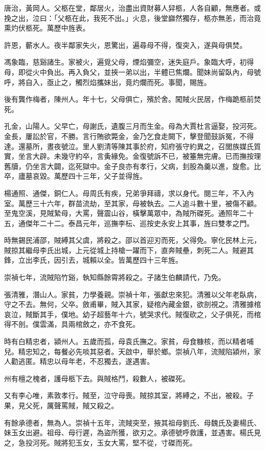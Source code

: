 \begin{pinyinscope}
唐治，黃岡人。父柩在堂，鄰居火，治盡出資財募人舁柩，人各自顧，無應者。或挽之出，泣曰：「父柩在此，我死不出。」火息，後堂巋然獨存，柩亦無恙，而治竟熏灼伏柩死。萬歷中旌表。

許恩，蘄水人。夜半鄰家失火，恩驚出，遍尋母不得，復突入，遂與母俱焚。

馮象臨，慈谿諸生。家被火，遍覓父母，煙焰彌空，迷失庭戶。象臨大呼，初得母，即從火中負出。再入負父，並挾一弟以出，半體已焦爛。聞妹尚留臥內，母號呼，將自入，亟止之，觸烈焰攜妹出，竟灼爛而死。事聞，賜旌。

後有龔作梅者，陳州人。年十七，父母俱亡，殯於舍。闖賊火民居，作梅跪柩前焚死。

孔金，山陽人。父早亡，母謝氏，遺腹三月而生金。母為大賈杜言逼娶，投河死。金長，屢訟於官，不勝。言行賄欲斃金，金乃乞食走闕下，擊登聞鼓訴冤，不得達。還墓所，晝夜號泣。里人劉清等陳其事於府，知府張守約異之，召閭族媒氏質實，坐言大辟。未幾守約卒，言夤緣免。金復號訴不已，被箠無完膚。已而撫按理舊牘，仍坐言大闢，迄死獄中。金子良亦有孝行，父病，刲股為羹以進，旋愈。比卒，廬墓哀毀。萬歷四十三年，父子並得旌。

楊通照、通傑，銅仁人。母周氏有疾，兄弟爭拜禱，求以身代。閱三年，不入內室。萬歷三十六年，群苗流劫，至其家，母被執去。二人追斗數十里，被傷不顧。至鬼空溪，見賊縶母，大罵，聲震山谷，橫擊萬眾中，為賊所磔死。通照年二十五，通傑年二十二。泰昌元年，巡撫李枟、巡按史永安上其事，旌曰雙孝之門。

時無錫民浦邵，賊縛其父虞，將殺之。邵以首迎刃而死，父得免。寧化民林上元，賊掠其繼母李氏出城，上元從城上持槍一躍而下，直奔賊壘，刺死二人。賊避其鋒，立出李氏，因引去，城賴以全。皆萬歷四十三年旌。

崇禎七年，流賊陷竹谿，執知縣餘霄將殺之。子諸生伯麟請代，乃免。

張清雅，潛山人。家貧，力學養親。崇禎十年，張獻忠來犯。清雅以父年老臥病，守之不去。無何，父卒。斂甫畢，賊入其家，疑棺內藏金銀，欲剖視之。清雅據棺哀泣，賊斷其手，僕地。幼子超藝年十六，號哭求代。賊復砍之，父子俱死，而棺得不剖。僕雲滿，具兩棺斂之，亦不食死。

時有白精忠者，潁州人。五歲而孤，母袁氏撫之。家貧，母食糠核，而以精者哺兒。精忠知之，每餐必先啖其惡者。天啟中，舉於鄉。崇禎八年，流賊陷潁州，家人勸逃匿。精忠以母年老，不忍獨去，遂遇害。

州有檀之槐者，護母柩下去。與賊格鬥，殺數人，被磔死。

又有李心唯，素敦孝行。賊至，泣守母喪。賊掠其室，將縛之，不出，被殺。子果，見父死，厲聲罵賊，賊又殺之。

有餘承德者，無為人。崇禎十五年，流賊突至，掖其祖母劉氏、母魏氏及妻楊氏、妹玉女出避。祖母、母行遲，為盜所獲，欲刃之。承德號呼救護，並遇害。楊氏見之，急投河死。賊將犯玉女，玉女大罵，堅不從，寸磔而死。


\end{pinyinscope}